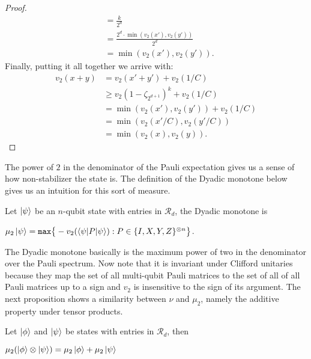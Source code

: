 \documentclass[12pt]{dalthesis}
\begin{document}
\begin{proof}
\begin{equation*}
\begin{split}
& = \frac{k}{2^d} \\
& = \frac{2^d \cdot \min (v_2(x'), v_2 (y'))}{2^d} \\
& = \min (v_2(x'), v_2 (y')).
\end{split}
\end{equation*}
Finally, putting it all together we arrive with:
\begin{equation*}
\begin{split}
v_2 (x + y) & = v_2(x' + y') + v_2(1/C) \\
& \geq v_2(1-\zeta_{2^{d+1}})^k + v_2(1/C) \\
& = \min (v_2(x'), v_2 (y')) + v_2 (1/C) \\
& = \min (v_2(x'/C), v_2 (y'/C)) \\
& = \min (v_2(x), v_2 (y)).
\end{split}
\end{equation*}
\end{proof}

The power of $2$ in the denominator of the Pauli expectation gives us a sense of how non-stabilizer the state is. The definition of the Dyadic monotone below gives us an intuition for this sort of measure. 

\begin{definition}
Let $\ket{\psi}$ be an $n$-qubit state with entries in $\mathcal{R}_d$, the Dyadic monotone is 
\begin{center}
$\mu_2 \ket{\psi} = \texttt{max} \big\{-v_2(\braket{\psi | P | \psi}): P \in \{I, X, Y, Z \}^{\otimes n} \big\}$.
\end{center}
\end{definition}
The Dyadic monotone basically is the maximum power of two in the denominator over the Pauli spectrum. Now note that it is invariant under Clifford unitaries because they map the set of all multi-qubit Pauli matrices to the set of all of all Pauli matrices up to a sign and $v_2$ is insensitive to the sign of its argument. The next proposition shows a similarity between $\nu$ and $\mu_2$, namely the additive property under tensor products.

\begin{proposition}
Let $\ket{\phi}$ and $\ket{\psi}$ be states with entries in $\mathcal{R}_d$, then 
\begin{center}
$\mu_2 (\ket{\phi} \otimes \ket{\psi}) = \mu_2 \ket{\phi} + \mu_2 \ket{\psi}$
\end{center}
\end{proposition}
\end{document}
